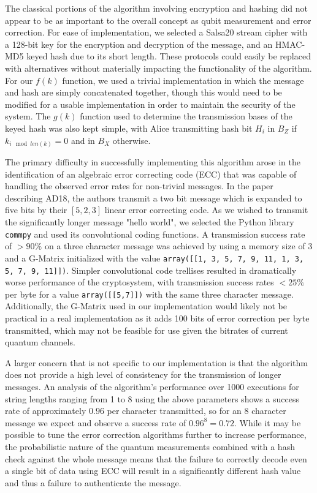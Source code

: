 \documentclass[sigconf]{acmart}
\begin{document}
The classical portions of the algorithm involving encryption and hashing did not appear to be as important to the overall concept as qubit measurement and error correction. For ease of implementation, we selected a Salsa20 stream cipher with a 128-bit key for the encryption and decryption of the message, and an HMAC-MD5 keyed hash due to its short length. These protocols could easily be replaced with alternatives without materially %
impacting the functionality of the algorithm. For our $f(k)$ function, we used a trivial implementation in which the message and hash are simply concatenated together, though this would need to be modified for a usable implementation in order to maintain the security of the system. The $g(k)$ function used to determine the transmission bases of the keyed hash was also kept simple, with Alice transmitting hash bit $H_i$ in $B_Z$ if $k_{i \mod len(k)} = 0$ and in $B_X$ otherwise.

The primary difficulty in successfully implementing this algorithm arose in the identification of an algebraic error correcting code (ECC) that was capable of handling the observed error rates for non-trivial messages. In the paper describing AD18, the authors transmit a two bit message which is expanded to five bits by their $[5,2,3]$ linear error correcting code. As we wished to transmit the significantly longer message "hello world", we selected the Python library \texttt{commpy} and used its convolutional coding functions. A transmission success rate of $>90\%$ on a three character message was achieved by using a memory size of 3 and a G-Matrix initialized with the value \texttt{array([[1, 3, 5, 7, 9, 11, 1, 3, 5, 7, 9, 11]])}. Simpler convolutional code trellises %
resulted in dramatically worse performance of the cryptosystem, with transmission success rates $<25\%$ per byte for a value \texttt{array([[5,7]])} with the same three character message. %
Additionally, the G-Matrix used in our implementation would likely not be practical in a real implementation as it adds 100 bits of error correction per byte transmitted, which may not be feasible for use given the bitrates of current quantum channels.

A larger concern that is not specific to our implementation is that the algorithm does not provide a high level of consistency for the transmission of longer messages. An analysis of the algorithm's performance over 1000 executions for string lengths ranging from 1 to 8 using the above parameters shows a success rate of approximately $0.96$ per character transmitted, so for an 8 character message we expect and observe a success rate of $0.96^8 = 0.72$. While it may be possible to tune the error correction algorithms further to increase performance, the probabilistic nature of the quantum measurements combined with a hash check against the whole message means that the failure to correctly decode even a single bit of data using ECC will result in a significantly different hash value and thus a failure to authenticate the message.
\end{document}
